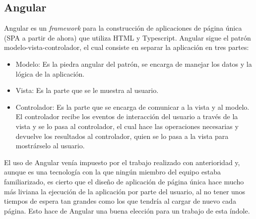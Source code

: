 \documentclass[11pt]{article}
\begin{document}
	\subsection{Angular}
Angular es un \emph{framework} para la construcción de aplicaciones de página única (SPA a partir de ahora) que utiliza HTML y Typescript. Angular sigue el patrón modelo-vista-controlador, el cual consiste en separar la aplicación en tres partes:
	\begin{itemize}
		\item Modelo: Es la piedra angular del patrón, se encarga de manejar los datos y la lógica de la aplicación.
		\item Vista: Es la parte que se le muestra al usuario.
		\item Controlador: Es la parte que se encarga de comunicar a la vista y al modelo. El controlador recibe los eventos de interacción del usuario a través de la vista y se lo pasa al controlador, el cual hace las operaciones necesarias y devuelve los resultados al controlador, quien se lo pasa a la vista para mostrárselo al usuario.
	\end{itemize}
	
	
El uso de Angular venía impuesto por el trabajo realizado con anterioridad y, aunque es una tecnología con la que ningún miembro del equipo  estaba familiarizado, es cierto que el diseño de aplicación de página única hace mucho más liviana la ejecución de la aplicación por parte del usuario, al no tener unos tiempos de espera tan grandes como los que tendría al cargar de nuevo cada página. Esto hace de Angular una buena elección para un trabajo de esta índole.
	
\end{document}
